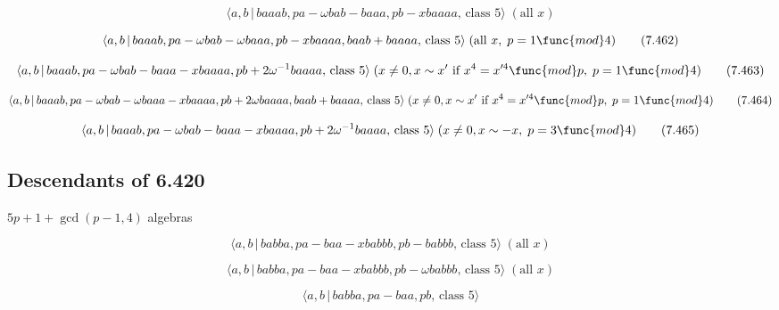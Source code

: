 \documentclass[10pt]{article}
\begin{document}
\begin{equation}
\langle a,b\,|\,baaab,pa-\omega bab-baaa,pb-xbaaaa,\,\text{class }5\rangle
\;(\text{all }x)  \tag{7.461}
\end{equation}

\begin{equation}
\langle a,b\,|\,baaab,pa-\omega bab-\omega baaa,pb-xbaaaa,baab+baaaa,\,\text{%
class }5\rangle \;(\text{all }x,\;p=1\func{mod}4)  \tag{7.462}
\end{equation}

\begin{equation}
\langle a,b\,|\,baaab,pa-\omega bab-baaa-xbaaaa,pb+2\omega ^{-1}baaaa,\,%
\text{class }5\rangle \;(x\neq 0,x\sim x^{\prime }\text{ if }x^{4}=x^{\prime
4}\func{mod}p,\;p=1\func{mod}4)  \tag{7.463}
\end{equation}

\begin{equation}
\langle a,b\,|\,baaab,pa-\omega bab-\omega baaa-xbaaaa,pb+2\omega
baaaa,baab+baaaa,\,\text{class }5\rangle \;(x\neq 0,x\sim x^{\prime }\text{
if }x^{4}=x^{\prime 4}\func{mod}p,\;p=1\func{mod}4)  \tag{7.464}
\end{equation}

\begin{equation}
\langle a,b\,|\,baaab,pa-\omega bab-baaa-xbaaaa,pb+2\omega ^{-1}baaaa,\,%
\text{class }5\rangle \;(x\neq 0,x\sim -x,\;p=3\func{mod}4)  \tag{7.465}
\end{equation}

\subsection{Descendants of 6.420}

$5p+1+\gcd (p-1,4)$ algebras

\begin{equation}
\langle a,b\,|\,babba,pa-baa-xbabbb,pb-babbb,\,\text{class }5\rangle \;(%
\text{all }x)  \tag{7.466}
\end{equation}

\begin{equation}
\langle a,b\,|\,babba,pa-baa-xbabbb,pb-\omega babbb,\,\text{class }5\rangle
\;(\text{all }x)  \tag{7.467}
\end{equation}

\begin{equation}
\langle a,b\,|\,babba,pa-baa,pb,\,\text{class }5\rangle  \tag{7.468}
\end{equation}
\end{document}
